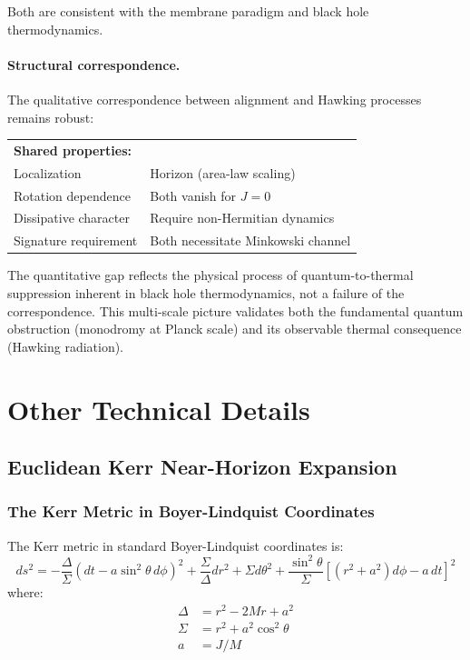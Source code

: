 \documentclass[11pt]{article}
\begin{document}
Both are consistent with the membrane paradigm and black hole thermodynamics.

\paragraph{Structural correspondence.}
The qualitative correspondence between alignment and Hawking processes remains robust:

\begin{center}
\begin{tabular}{ll}
\textbf{Shared properties:} & \\
Localization & Horizon (area-law scaling) \\
Rotation dependence & Both vanish for $J=0$ \\
Dissipative character & Require non-Hermitian dynamics \\
Signature requirement & Both necessitate Minkowski channel \\
\end{tabular}
\end{center}

\noindent
The quantitative gap reflects the physical process of quantum-to-thermal 
suppression inherent in black hole thermodynamics, not a failure of the 
correspondence. This multi-scale picture validates both the fundamental 
quantum obstruction (monodromy at Planck scale) and its observable 
thermal consequence (Hawking radiation).

\section{ Other Technical Details}
\subsection{Euclidean Kerr Near-Horizon Expansion}
\label{subsec:eucl-kerr-nh}

\subsubsection{The Kerr Metric in Boyer-Lindquist Coordinates}

The Kerr metric in standard Boyer-Lindquist coordinates is:
\begin{equation}
ds^2 = -\frac{\Delta}{\Sigma}(dt - a\sin^2\theta\, d\phi)^2 + \frac{\Sigma}{\Delta}dr^2 + \Sigma d\theta^2 + \frac{\sin^2\theta}{\Sigma}[(r^2+a^2)d\phi - a\,dt]^2
\end{equation}
where:
\begin{align}
\Delta &= r^2 - 2Mr + a^2 \\
\Sigma &= r^2 + a^2\cos^2\theta \\
a &= J/M
\end{align}
\end{document}
